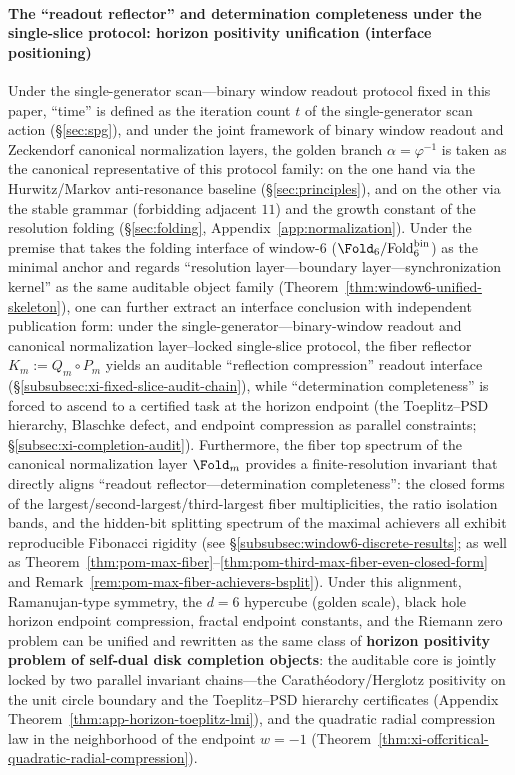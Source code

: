 \paragraph{The ``readout reflector'' and determination completeness under the single-slice protocol: horizon positivity unification (interface positioning)}
Under the single-generator scan---binary window readout protocol fixed in this paper, ``time'' is defined as the iteration count \(t\) of the single-generator scan action (\S\ref{sec:spg}), and under the joint framework of binary window readout and Zeckendorf canonical normalization layers, the golden branch \(\alpha=\varphi^{-1}\) is taken as the canonical representative of this protocol family: on the one hand via the Hurwitz/Markov anti-resonance baseline (\S\ref{sec:principles}), and on the other via the stable grammar (forbidding adjacent \(11\)) and the growth constant of the resolution folding (\S\ref{sec:folding}, Appendix~\ref{app:normalization}).
Under the premise that takes the folding interface of window-\(6\) (\(\Fold_6/\mathrm{Fold}^{\mathrm{bin}}_6\)) as the minimal anchor and regards ``resolution layer---boundary layer---synchronization kernel'' as the same auditable object family (Theorem~\ref{thm:window6-unified-skeleton}), one can further extract an interface conclusion with independent publication form: under the single-generator---binary-window readout and canonical normalization layer--locked single-slice protocol, the fiber reflector \(K_m:=Q_m\circ P_m\) yields an auditable ``reflection compression'' readout interface (\S\ref{subsubsec:xi-fixed-slice-audit-chain}), while ``determination completeness'' is forced to ascend to a certified task at the horizon endpoint (the Toeplitz--PSD hierarchy, Blaschke defect, and endpoint compression as parallel constraints; \S\ref{subsec:xi-completion-audit}).
Furthermore, the fiber top spectrum of the canonical normalization layer \(\Fold_m\) provides a finite-resolution invariant that directly aligns ``readout reflector---determination completeness'': the closed forms of the largest/second-largest/third-largest fiber multiplicities, the ratio isolation bands, and the hidden-bit splitting spectrum of the maximal achievers all exhibit reproducible Fibonacci rigidity (see \S\ref{subsubsec:window6-discrete-results}; as well as Theorem~\ref{thm:pom-max-fiber}--\ref{thm:pom-third-max-fiber-even-closed-form} and Remark~\ref{rem:pom-max-fiber-achievers-bsplit}).
Under this alignment, Ramanujan-type symmetry, the \(d=6\) hypercube (golden scale), black hole horizon endpoint compression, fractal endpoint constants, and the Riemann zero problem can be unified and rewritten as the same class of \textbf{horizon positivity problem of self-dual disk completion objects}: the auditable core is jointly locked by two parallel invariant chains---the Carath\'eodory/Herglotz positivity on the unit circle boundary and the Toeplitz--PSD hierarchy certificates (Appendix Theorem~\ref{thm:app-horizon-toeplitz-lmi}), and the quadratic radial compression law in the neighborhood of the endpoint \(w=-1\) (Theorem~\ref{thm:xi-offcritical-quadratic-radial-compression}).
